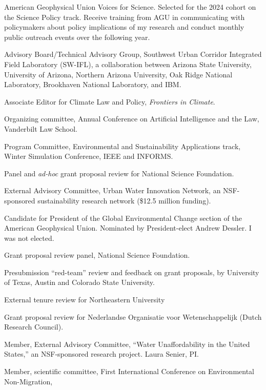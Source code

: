 \item[2024--2025] American Geophysical Union Voices for Science. Selected for
  the 2024 cohort on the Science Policy track. Receive training from AGU in
  communicating with policymakers about policy implications of my research and
  conduct monthly public outreach events over the following year.
\item[2023--2025] Advisory Board/Technical Advisory Group,
  Southwest Urban Corridor Integrated Field Laboratory (SW-IFL),
  a collaboration between Arizona State University, University of Arizona,
  Northern Arizona University, Oak Ridge National Laboratory,
  Brookhaven National Laboratory, and IBM.
\item[2021--present] Associate Editor for Climate Law and Policy,
   \emph{Frontiers in Climate}.
\item[2016--present] Organizing committee,
  Annual Conference on Artificial Intelligence and the Law,
  Vanderbilt Law School.
\item[2016--present] Program Committee,
  Environmental and Sustainability Applications track,
  Winter Simulation Conference, IEEE and INFORMS.
\item[2023] Panel and \emph{ad-hoc\/} grant proposal review for National Science Foundation.
\item[2016--2021] External Advisory Committee,
  Urban Water Innovation Network, an NSF-sponsored sustainability
  research network (\$12.5 million funding).
\item[2022] Candidate for President of the Global Environmental Change
  section of the American Geophysical Union. Nominated by President-elect
  Andrew Dessler. I was not elected.
\item[2022] Grant proposal review panel, National Science Foundation.
\item[2022] Presubmission ``red-team'' review and feedback on grant proposals,
  by University of Texas, Austin and Colorado State University.
\item[2021] External tenure review for Northeastern University
\item[2021] Grant proposal review for Nederlandse Organisatie voor Wetenschappelijk
  (Dutch Research Council).
\item[2019--2021] Member, External Advisory Committee,
  ``Water Unaffordability in the United States,''
  an NSF-sponsored research project. Laura Senier, PI.
\item[2019] Member, scientific committee,
  First International Conference on Environmental Non-Migration,
